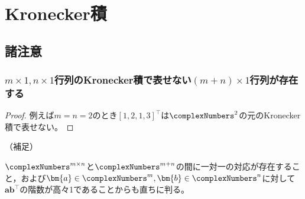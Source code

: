     \section{Kronecker積}
        \subsection{諸注意}
            \subsubsection{\texorpdfstring{$m\times 1,n\times 1$}{m×1,n×1}行列のKronecker積で表せない\texorpdfstring{$(m+n)\times 1$}{(m+n)×1}行列が存在する}
            \begin{proof}
                例えば$m=n=2$のとき$[1, 2, 1, 3]^\top$は$\complexNumbers^2$の元のKronecker積で表せない。
            \end{proof}
            （補足）
            \par
            $\complexNumbers^{m\times n}$と$\complexNumbers^{m+n}$の間に一対一の対応が存在すること，および$\bm{a}\in\complexNumbers^m,\bm{b}\in\complexNumbers^n$に対して$\bm{a}\bm{b}^\top$の階数が高々1であることからも直ちに判る。
